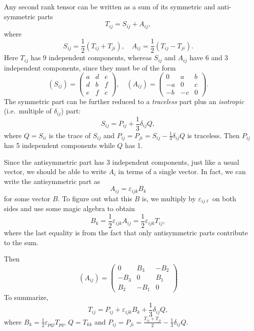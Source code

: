 \documentclass[a4paper]{article}
\begin{document}
Any second rank tensor can be written as a sum of its symmetric and anti-symmetric parts
\[
  T_{ij} = S_{ij} + A_{ij},
\]
where
\[
  S_{ij} = \frac{1}{2}(T_{ij} + T_{ji}),\quad A_{ij} = \frac{1}{2}(T_{ij} - T_{ji}).
\]
Here $T_{ij}$ has 9 independent components, whereas $S_{ij}$ and $A_{ij}$ have 6 and 3 independent components, since they must be of the form
\[
  (S_{ij}) =
  \begin{pmatrix}
    a & d & e\\
    d & b & f\\
    e & f & c
  \end{pmatrix}
  ,\quad
  (A_{ij}) =
  \begin{pmatrix}
    0 & a & b\\
    -a & 0 & c\\
    -b & -c & 0
  \end{pmatrix}.
\]
The symmetric part can be further reduced to a \emph{traceless} part plus an \emph{isotropic} (i.e.\ multiple of $\delta_{ij}$) part:
\[
  S_{ij} = P_{ij} + \frac{1}{3}\delta_{ij} Q,
\]
where $Q = S_{ii}$ is the trace of $S_{ij}$ and $P_{ij} = P_{ji} = S_{ij} -\frac{1}{3}\delta_{ij}Q$ is traceless. Then $P_{ij}$ has 5 independent components while $Q$ has 1.

Since the antisymmetric part has 3 independent components, just like a usual vector, we should be able to write $A_{i}$ in terms of a single vector. In fact, we can write the antisymmetric part as
\[
  A_{ij} = \varepsilon_{ijk}B_k
\]
for some vector $B$. To figure out what this $B$ is, we multiply by $\varepsilon_{ij\ell}$ on both sides and use some magic algebra to obtain
\[
  B_k = \frac{1}{2}\varepsilon_{ijk}A_{ij} = \frac{1}{2}\varepsilon_{ijk}T_{ij},
\]
where the last equality is from the fact that only antisymmetric parts contribute to the sum.

Then
\[
  (A_{ij}) =
  \begin{pmatrix}
    0 & B_3 & -B_2\\
    -B_3 & 0 & B_1\\
    B_2 & -B_1 & 0
  \end{pmatrix}
\]
To summarize,
\[
  T_{ij} = P_{ij} + \varepsilon_{ijk}B_k + \frac{1}{3}\delta_{ij}Q,
\]
where $B_k = \frac{1}{2}\varepsilon_{pqj} T_{pq}$, $Q = T_{kk}$ and $P_{ij} = P_{ji} = \frac{T_{ij} + T_{ji}}{2} - \frac{1}{3}\delta_{ij}Q$.
\end{document}
